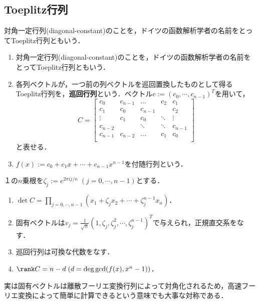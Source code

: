 \documentclass[uplatex, dvipdfmx]{jsreport}
\begin{document}
\subsection{Toeplitz行列}

\begin{tcolorbox}[colframe=ForestGreen, colback=ForestGreen!10!white,breakable,colbacktitle=ForestGreen!40!white,coltitle=black,fonttitle=\bfseries\sffamily,
title=]
    対角一定行列(diagonal-constant)のことを，ドイツの函数解析学者の名前をとってToeplitz行列ともいう．
\end{tcolorbox}

\begin{definition}\mbox{}
    \begin{enumerate}
        \item 対角一定行列(diagonal-constant)のことを，ドイツの函数解析学者の名前をとってToeplitz行列ともいう．
        \item 各列ベクトルが，一つ前の列ベクトルを巡回置換したものとして得るToeplitz行列を，\textbf{巡回行列}という．ベクトル$c:=(c_0,\cdots,c_{n-1})^T$を用いて，
        \[C=\begin{bmatrix}c_{0}&c_{n-1}&\dots &c_{2}&c_{1}\\c_{1}&c_{0}&c_{n-1}&&c_{2}\\\vdots &c_{1}&c_{0}&\ddots &\vdots \\c_{n-2}&&\ddots &\ddots &c_{n-1}\\c_{n-1}&c_{n-2}&\dots &c_{1}&c_{0}\\\end{bmatrix}\]
        と表せる．
        \item $f(x):=c_0+c_1x+\cdots+c_{n-1}x^{n-1}$を付随行列という．
    \end{enumerate}
\end{definition}

\begin{lemma}
    １の$n$乗根を$\zeta_j:=e^{2\pi ij/n}\;(j=0,\cdots,n-1)$とする．
    \begin{enumerate}
        \item $\det C=\prod_{j=0,\cdots,n-1}(x_1+\zeta_jx_2+\cdots+\zeta_j^{n-1}x_n)$．
        \item 固有ベクトルは$v_j=\frac{1}{\sqrt{n}}(1,\zeta_j,\zeta_j^2,\cdots,\zeta_j^{n-1})^T$で与えられ，正規直交系をなす．
        \item 巡回行列は可換な代数をなす．
        \item $\rank C=n-d\;(d=\deg\gcd(f(x),x^n-1))$．
    \end{enumerate}
\end{lemma}
\begin{remark}
    実は固有ベクトルは離散フーリエ変換行列によって対角化されるため，高速フーリエ変換によって簡単に計算できるという意味でも大事な対称である．
\end{remark}
\end{document}
